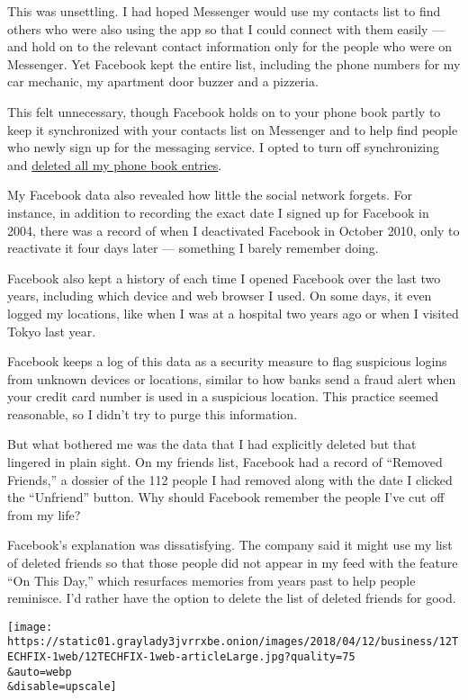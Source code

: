 This was unsettling. I had hoped Messenger would use my contacts list to
find others who were also using the app so that I could connect with
them easily --- and hold on to the relevant contact information only for
the people who were on Messenger. Yet Facebook kept the entire list,
including the phone numbers for my car mechanic, my apartment door
buzzer and a pizzeria.

This felt unnecessary, though Facebook holds on to your phone book
partly to keep it synchronized with your contacts list on Messenger and
to help find people who newly sign up for the messaging service. I opted
to turn off synchronizing and
\href{https://www.facebookcorewwwi.onion/invite_history.php}{deleted all
my phone book entries}.

My Facebook data also revealed how little the social network forgets.
For instance, in addition to recording the exact date I signed up for
Facebook in 2004, there was a record of when I deactivated Facebook in
October 2010, only to reactivate it four days later --- something I
barely remember doing.

Facebook also kept a history of each time I opened Facebook over the
last two years, including which device and web browser I used. On some
days, it even logged my locations, like when I was at a hospital two
years ago or when I visited Tokyo last year.

Facebook keeps a log of this data as a security measure to flag
suspicious logins from unknown devices or locations, similar to how
banks send a fraud alert when your credit card number is used in a
suspicious location. This practice seemed reasonable, so I didn't try to
purge this information.

But what bothered me was the data that I had explicitly deleted but that
lingered in plain sight. On my friends list, Facebook had a record of
``Removed Friends,'' a dossier of the 112 people I had removed along
with the date I clicked the ``Unfriend'' button. Why should Facebook
remember the people I've cut off from my life?

Facebook's explanation was dissatisfying. The company said it might use
my list of deleted friends so that those people did not appear in my
feed with the feature ``On This Day,'' which resurfaces memories from
years past to help people reminisce. I'd rather have the option to
delete the list of deleted friends for good.

\texttt{[image: https://static01.graylady3jvrrxbe.onion/images/2018/04/12/business/12TECHFIX-1web/12TECHFIX-1web-articleLarge.jpg?quality=75\\\&auto=webp\\\&disable=upscale]}

